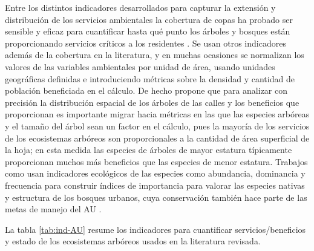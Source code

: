 \documentclass[12pt,]{book}
\begin{document}
Entre los distintos indicadores desarrollados para capturar la extensión
y distribución de los servicios ambientales la cobertura de copas ha
probado ser sensible y eficaz para cuantificar hasta qué punto los
árboles y bosques están proporcionando servicios críticos a los
residentes \citep{nowak_sustaining_2010}. Se usan otros indicadores
además de la cobertura en la literatura, y en muchas ocasiones se
normalizan los valores de las variables ambientales por unidad de área,
usando unidades geográficas definidas e introduciendo métricas sobre la
densidad y cantidad de población beneficiada en el cálculo. De hecho
\citep{cowett_methodology_2014} propone que para analizar con precisión
la distribución espacial de los árboles de las calles y los beneficios
que proporcionan es importante migrar hacia métricas en las que las
especies arbóreas y el tamaño del árbol sean un factor en el cálculo,
pues la mayoría de los servicios de los ecosistemas arbóreos son
proporcionales a la cantidad de área superficial de la hoja; en esta
medida las especies de árboles de mayor estatura típicamente
proporcionan muchos más beneficios que las especies de menor estatura.
Trabajos como \citep{alanis_estructura_2014} usan indicadores ecológicos
de las especies como abundancia, dominancia y frecuencia para construir
índices de importancia para valorar las especies nativas y estructura de
los bosques urbanos, cuya conservación también hace parte de las metas
de manejo del AU \citep{nowak_sustaining_2010}.

La tabla \ref{tab:ind-AU} resume los indicadores para cuantificar
servicios/beneficios y estado de los ecosistemas arbóreos usados en la
literatura revisada.
\end{document}
